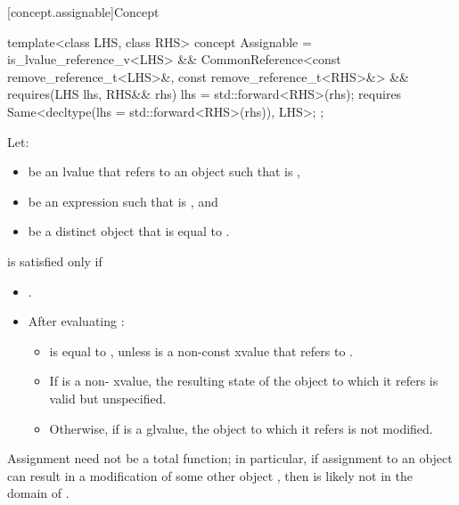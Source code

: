 [concept.assignable]{Concept }

%
\begin{itemdecl}
template<class LHS, class RHS>
  concept Assignable =
    is_lvalue_reference_v<LHS> &&
    CommonReference<const remove_reference_t<LHS>&, const remove_reference_t<RHS>&> &&
    requires(LHS lhs, RHS&& rhs) {
      lhs = std::forward<RHS>(rhs);
      requires Same<decltype(lhs = std::forward<RHS>(rhs)), LHS>;
    };
\end{itemdecl}

\begin{itemdescr}
\pnum
Let:
\begin{itemize}
\item {} be an lvalue that refers to an object  such that
   is ,
\item {} be an expression such that  is
  , and
\item {} be a distinct object that is equal to .
\end{itemize}
 is satisfied only if

\begin{itemize}
\item {}.

\item After evaluating :

\begin{itemize}
\item {} is equal to , unless  is a non-const
xvalue that refers to .

\item If  is a non- xvalue, the resulting state of the
object to which it refers is valid but unspecified.

\item Otherwise, if  is a glvalue, the object to which it refers is
  not modified.
\end{itemize}
\end{itemize}

\pnum
\begin{note}
Assignment need not be a total function;
in particular, if assignment to an object  can result in a modification
of some other object , then  is likely not in the domain
of \tcode{=}.
\end{note}
\end{itemdescr}

